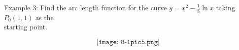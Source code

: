 \documentclass[paper=a4, fontsize=11pt]{scrartcl} %
\numberwithin{equation}{section} %
\numberwithin{figure}{section} %
\numberwithin{table}{section} %
\newcommand{\ds}{\displaystyle}
\begin{document}
  \underline{Example 3}: Find the arc length function for the curve $y=x^2-\ds\frac{1}{8}\ln x$ taking $P_0(1,1)$ as the\\
  \hspace{0.81in} starting point.\\
  \indent
  
  \vspace{3.8in}
  
  \[\texttt{[image: 8-1pic5.png]}\]




















\end{document}
